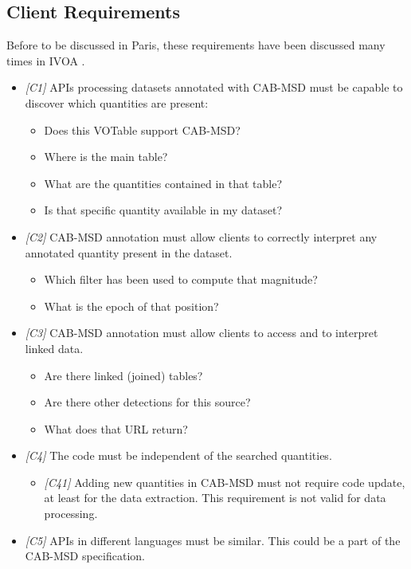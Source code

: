 \documentclass[11pt,a4paper]{ivoa}
\begin{document}
\subsection{Client Requirements}
Before to be discussed in Paris, these requirements have been discussed many times in IVOA
.
\begin{itemize}
    \item  \textit{[C1]} APIs processing datasets annotated with CAB-MSD must be capable to discover which quantities are present:
    \begin{itemize}
        \item Does this VOTable support CAB-MSD?
        \item Where is the main table?
        \item What are the quantities contained in that table?
        \item Is that specific quantity available in my dataset?
    \end{itemize}
\end{itemize}
\begin{itemize}
    \item \textit{[C2]} CAB-MSD annotation must allow clients to correctly interpret any annotated quantity present in the dataset.
    \begin{itemize}
        \item Which filter has been used to compute that magnitude?
        \item What is the epoch of that position?
    \end{itemize}
\end{itemize}
\begin{itemize}
    \item  \textit{[C3]} CAB-MSD annotation must allow clients to access and to interpret linked data.
    \begin{itemize}
        \item Are there linked (joined) tables?
        \item Are there other detections for this source?
        \item What does that  URL return?
    \end{itemize}
\end{itemize}

\begin{itemize}
    \item \textit{[C4]} The code must be independent of the searched quantities.
    \begin{itemize}
        \item \textit{[C41]} Adding new quantities in CAB-MSD must not require code update, at least for the data extraction. This requirement is not valid for data processing.
    \end{itemize}
\end{itemize}
\begin{itemize}
    \item \textit{[C5]} APIs in different languages must be similar. This could be a part of the CAB-MSD specification.
\end{itemize}
\end{document}
